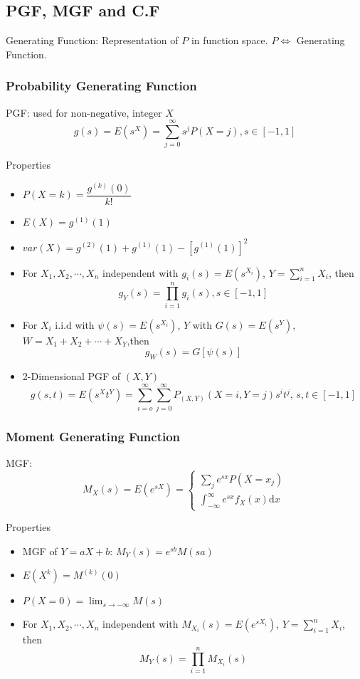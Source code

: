 \subsection{PGF, MGF and C.F}\label{SectionPGFMGFCF}

    Generating Function: Representation of $P$ in function space. $P\Leftrightarrow$ Generating Function.

\subsubsection{Probability Generating Function}
    PGF: used for non-negative, integer $X$
    \[
        g(s)=E(s^X)=\sum_{j=0}^\infty s^jP(X=j)    ,s\in[-1,1]
    \]

    Properties
    \begin{itemize}
        \item $P(X=k)=\dfrac{g^{(k)}(0)}{k!}$
        \item $E(X)=g^{(1)}(1)$
        \item $var(X)=g^{(2)}(1)+g^{(1)}(1)-[g^{(1)}(1)]^2 $
        \item For $X_1,X_2,\cdots,X_n$ independent with $g_i(s)=E(s^{X_i})$, $Y={\displaystyle \sum_{i=1}^n} X_i$, then
        \[
            g_Y(s)=\prod_{i=1}^n g_i(s),s\in[-1,1]
        \]
        \item For ${X_i}$ i.i.d with $\psi(s)=E(s^{X_i})$, $Y$ with $G(s)=E(s^{Y})$, $W=X_1+X_2+\cdots +X_Y$,then
        \[
            g_W(s)=G[\psi(s)]    
        \]
        \item 2-Dimensional PGF of $(X,Y)$
        \[
            g(s,t)=E(s^Xt^Y)=\sum_{i=o}^\infty\sum_{j=0}^\infty P_{(X,Y)}(X=i,Y=j)s^it^j,\, s,t\in[-1,1]
        \]
    \end{itemize}
\subsubsection{Moment Generating Function}
    MGF: 
    \[
        M_X(s)=E(e^{sX})=\begin{cases}
            \sum_je^{sx}P(X=x_j)\\
            \int_{-\infty}^\infty e^{sx}f_X(x)\mathrm{d}x
        \end{cases}
    \]

    Properties
    \begin{itemize}
        \item MGF of $Y=aX+b$: $
            M_Y(s)=e^{sb}M(sa)    $
        \item $E(X^k)=M^{(k)}(0)$
        \item $P(X=0)={\displaystyle\lim_{s\to -\infty}}M(s)$
        \item For $X_1,X_2,\cdots,X_n$ independent with $M_{X_i}(s)=E(e^{sX_i})$, $Y={\displaystyle \sum_{i=1}^n} X_i$, then
        \[
            M_Y(s)=\prod_{i=1}^n M_{X_i}(s)
        \]
    \end{itemize}
